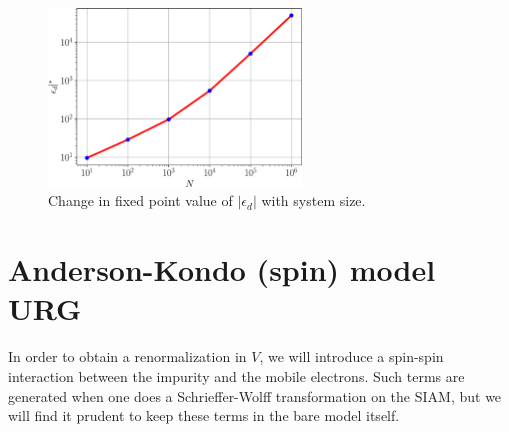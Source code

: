 \documentclass[twoside,11pt]{report}
\numberwithin{equation}{section}
\begin{document}
\begin{figure}[htpb]
	\centering
	\includegraphics[width=0.6\textwidth]{../figures/ed_vs_size.pdf}
	\caption{Change in fixed point value of \(|\epsilon_d|\) with system size.}
	\label{edvsD}
\end{figure}
\section{Anderson-Kondo (spin) model URG}
In order to obtain a renormalization in \(V\), we will introduce a spin-spin interaction between the impurity and the mobile electrons. Such terms are generated when one does a Schrieffer-Wolff transformation on the SIAM, but we will find it prudent to keep these terms in the bare model itself.
\end{document}
